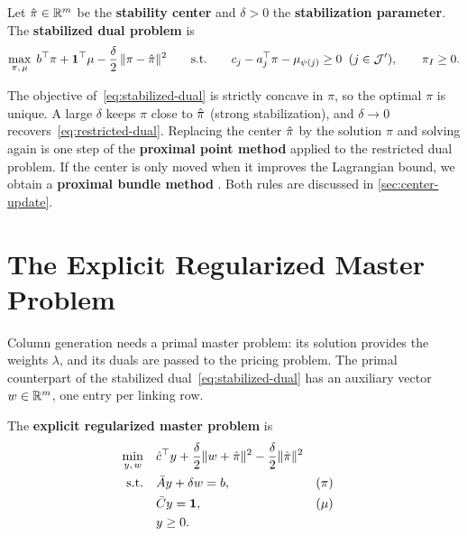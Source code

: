 \begin{definition} \label{def:stabilized-dual}
Let $\hat{\pi}\in\mathbb{R}^m$ be the \textbf{stability center} and $\delta>0$ the
\textbf{stabilization parameter}. The \textbf{stabilized dual problem} is
\begin{equation} \label{eq:stabilized-dual}
\max_{\pi,\,\mu}\; b^\top\pi + \mathbf{1}^\top\mu - \frac{\delta}{2}\,\lVert\pi-\hat{\pi}\rVert^2
\qquad\text{s.t.}\qquad
c_j - a_j^\top\pi - \mu_{\psi(j)}\ge0 \;\;(j\in\mathcal{J}'),\qquad \pi_I\ge0 .
\end{equation}
\end{definition}

The objective of~\eqref{eq:stabilized-dual} is strictly concave in $\pi$, so the optimal
$\pi$ is unique. A large $\delta$ keeps $\pi$ close to $\hat{\pi}$ (strong stabilization), and
$\delta\to0$ recovers~\eqref{eq:restricted-dual}. Replacing the center $\hat{\pi}$ by the
solution $\pi$ and solving again is one step of the \textbf{proximal point method}
\cite{rockafellar1976monotone} applied to the restricted dual problem. If the center is only
moved when it improves the Lagrangian bound, we obtain a \textbf{proximal bundle method}
\cite{kiwiel1990proximity, briant2008comparison}. Both rules are discussed in
\cref{sec:center-update}.


\section{The Explicit Regularized Master Problem}
\label{sec:explicit}

Column generation needs a primal master problem: its solution provides the weights $\lambda$,
and its duals are passed to the pricing problem. The primal counterpart of the stabilized
dual~\eqref{eq:stabilized-dual} has an auxiliary vector $w\in\mathbb{R}^m$, one entry per linking row.

\begin{definition} \label{def:explicit}
The \textbf{explicit regularized master problem} is
\begin{subequations} \label{eq:explicit}
\begin{align}
\min_{y,\,w}\quad & \hat{c}^\top y + \frac{\delta}{2}\lVert w + \hat{\pi}\rVert^2
                     - \frac{\delta}{2}\lVert\hat{\pi}\rVert^2 \\
\text{s.t.}\quad & \bar{A} y + \delta w = b, && (\pi) \label{eq:explicit-link}\\
& \bar{C} y = \mathbf{1}, && (\mu)\\
& y\ge0 .
\end{align}
\end{subequations}
\end{definition}

